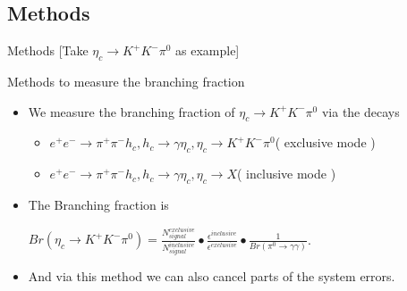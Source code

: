 \documentclass{beamer}
\begin{document}
\subsection{Methods}
\begin{frame}{Methods [Take $\eta_c\to K^+K^-\pi^0$ as example]}
  \begin{block}{Methods to measure the branching fraction}
    \begin{itemize}
      \item We measure the branching fraction of $\eta_c\to K^+K^-\pi^0$ via the decays
        \begin{itemize}
          \item $e^+e^-\to \pi^+ \pi^- h_c, h_c\to \gamma\eta_c, \eta_c\to K^+K^-\pi^0$( exclusive mode )
          \item $e^+e^-\to \pi^+ \pi^- h_c, h_c\to \gamma\eta_c, \eta_c\to X$( inclusive mode )
        \end{itemize}
      \item The Branching fraction is\\
        \begin{center}
          $Br(\eta_c\to K^+K^-\pi^0) = \frac{N^{exclusive}_{signal}}{N^{inclusive}_{signal}}\bullet\frac{\epsilon^{inclusive}}{\epsilon^{exclusive}}\bullet\frac{1}{Br(\pi^0\to\gamma\gamma)}$.
        \end{center}
    \end{itemize}
  \end{block}
  \begin{block}{}
    \begin{itemize}
      \item And via this method we can also cancel parts of the system errors.
    \end{itemize}
  \end{block}
\end{frame}
\end{document}
